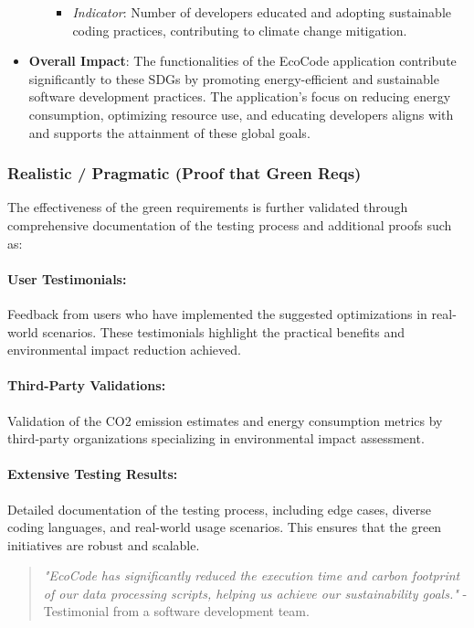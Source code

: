 \documentclass[conference,compsoc]{IEEEtran}
\begin{document}
\begin{itemize}
\begin{itemize}
\begin{itemize}
			            \item \textit{Indicator}: Number of developers educated and adopting sustainable coding practices, contributing to climate change mitigation.
		            \end{itemize}
	      \end{itemize}
	\item \textbf{Overall Impact}: The functionalities of the EcoCode application contribute significantly to these SDGs by promoting energy-efficient and sustainable software development practices. The application's focus on reducing energy consumption, optimizing resource use, and educating developers aligns with and supports the attainment of these global goals.
\end{itemize}

\subsubsection{Realistic / Pragmatic (Proof that Green Reqs)}
\label{sec:realistic_pragmatic}

The effectiveness of the green requirements is further validated through comprehensive documentation of the testing process and additional proofs such as:

\paragraph{User Testimonials:}
Feedback from users who have implemented the suggested optimizations in real-world scenarios. These testimonials highlight the practical benefits and environmental impact reduction achieved.

\paragraph{Third-Party Validations:}
Validation of the CO2 emission estimates and energy consumption metrics by third-party organizations specializing in environmental impact assessment.

\paragraph{Extensive Testing Results:}
Detailed documentation of the testing process, including edge cases, diverse coding languages, and real-world usage scenarios. This ensures that the green initiatives are robust and scalable.

\begin{quote}
\textit{"EcoCode has significantly reduced the execution time and carbon footprint of our data processing scripts, helping us achieve our sustainability goals."} - Testimonial from a software development team.
\end{quote}
\end{document}

